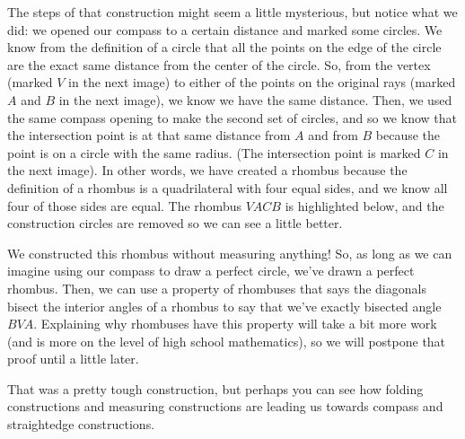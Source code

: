 \documentclass{ximera}
\begin{document}
The steps of that construction might seem a little mysterious, but notice what we did: we opened our compass to a certain distance and marked some circles. We know from the definition of a circle that all the points on the edge of the circle are the exact same distance from the center of the circle. So, from the vertex (marked $V$ in the next image) to either of  the points on the original rays (marked $A$ and $B$ in the next image), we know we have the same distance. Then, we used the same compass opening to make the second set of circles, and so we know that the intersection point is at that same distance from $A$ and from $B$ because the point is on a circle with the same radius. (The intersection point is marked $C$ in the next image). In other words, we have created a rhombus because the definition of a rhombus is a quadrilateral with four equal sides, and we know all four of those sides are equal. The rhombus $VACB$ is highlighted below, and the construction circles are removed so we can see a little better.
\begin{center}
\begin{center}
\end{center}
\end{center}
We constructed this rhombus without measuring anything! So, as long as we can imagine using our compass to draw a perfect circle, we've drawn a perfect rhombus. Then, we can use a property of rhombuses that says the diagonals bisect the interior angles of a rhombus to say that we've exactly bisected angle $BVA$. Explaining why rhombuses have this property will take a bit more work (and is more on the level of high school mathematics), so we will postpone that proof until a little later.

That was a pretty tough construction, but perhaps you can see how folding constructions and measuring constructions are leading us towards compass and straightedge constructions.
\end{document}
